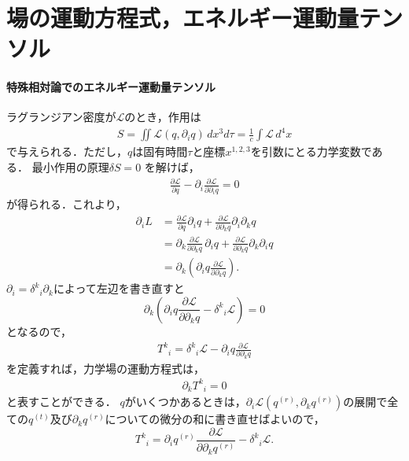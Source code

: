 \documentclass[a4paper]{ltjsreport}
\begin{document}
\section{場の運動方程式，エネルギー運動量テンソル}
\paragraph{特殊相対論でのエネルギー運動量テンソル}
ラグランジアン密度が${\mathcal{L}}$のとき，作用は
\begin{align}
  S=\iint{\mathcal{L}}\left(q,\partial_iq\right)\,dx^3d\tau=\frac{1}{c}\int{}\mathcal{L}\,d^4x
\end{align}
で与えられる．ただし，$q$は固有時間$\tau$と座標$x^{1,2,3}$を引数にとる力学変数である．
最小作用の原理$\delta{S}=0$
を解けば，
\begin{align}
  \frac{\partial{\mathcal{L}}}{\partial{q}} - \partial_i\frac{\partial{\mathcal{L}}}{\partial\partial_iq}=0\label{EL_eom}
\end{align}
が得られる．これより，
\begin{align*}
  \partial_iL &= \frac{\partial{\mathcal{L}}}{\partial{q}}\partial_iq + \frac{\partial{\mathcal{L}}}{\partial\partial_k{q}}\partial_i\partial_kq\\
  &= \partial_k\frac{\partial{\mathcal{L}}}{\partial\partial_kq}\,\partial_iq + \frac{\partial{\mathcal{L}}}{\partial\partial_k{q}}\partial_k\partial_iq\\
  &= \partial_k\left(\partial_iq\frac{\partial{\mathcal{L}}}{\partial\partial_kq}\right) .
\end{align*}
$\partial_i={\delta^k}_i\partial_k$によって左辺を書き直すと
\[ \partial_k\left(\partial_iq\frac{\partial{\mathcal{L}}}{\partial\partial_kq} - {\delta^k}_i\mathcal{L}\right) = 0 \]
となるので，
\begin{align}
  {T^k}_i={\delta^k}_i\mathcal{L} - \partial_iq\frac{\partial{\mathcal{L}}}{\partial\partial_kq}\label{spe_T_mixed}
\end{align}
を定義すれば，力学場の運動方程式は，
\begin{align}
  \partial_k{T^k}_i=0\label{spe_T}
\end{align}
と表すことができる．
$q$がいくつかあるときは，$\partial_i\mathcal{L}\left(q^{(r)},\partial_kq^{(r)}\right)$の展開で全ての$q^{(t)}$及び$\partial_kq^{(r)}$についての微分の和に書き直せばよいので，
\[ {T^k}_i=\partial_iq^{(r)}\frac{\partial{\mathcal{L}}}{\partial\partial_kq^{(r)}} - {\delta^k}_i\mathcal{L} . \]
\end{document}
